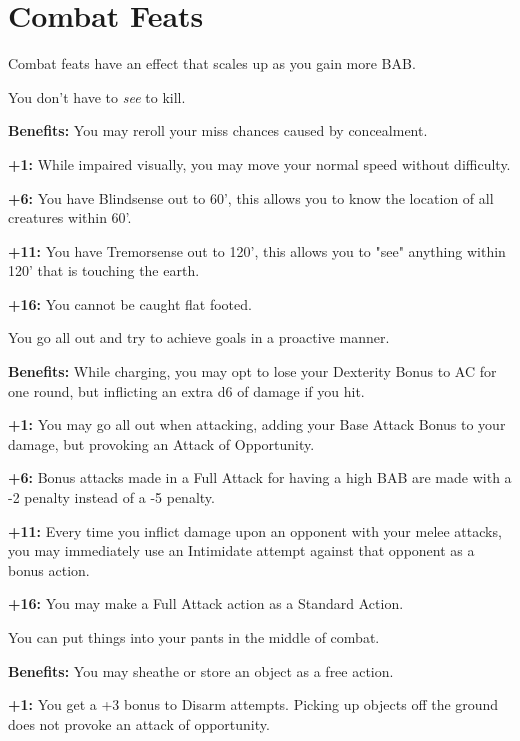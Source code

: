 \section{Combat Feats}

Combat feats have an effect that scales up as you gain more BAB.


You don't have to \textit{see} to kill.

\textbf{Benefits:} You may reroll your miss chances caused by concealment.

\textbf{+1:} While impaired visually, you may move your normal speed without difficulty.

\textbf{+6:} You have Blindsense out to 60', this allows you to know the location of all creatures within 60'.

\textbf{+11:} You have Tremorsense out to 120', this allows you to "see" anything within 120' that is touching the earth.

\textbf{+16:} You cannot be caught flat footed.


You go all out and try to achieve goals in a proactive manner.

\textbf{Benefits:} While charging, you may opt to lose your Dexterity Bonus to AC for one round, but inflicting an extra d6 of damage if you hit.

\textbf{+1:} You may go all out when attacking, adding your Base Attack Bonus to your damage, but provoking an Attack of Opportunity.

\textbf{+6:} Bonus attacks made in a Full Attack for having a high BAB are made with a -2 penalty instead of a -5 penalty.

\textbf{+11:} Every time you inflict damage upon an opponent with your melee attacks, you may immediately use an Intimidate attempt against that opponent as a bonus action.

\textbf{+16:} You may make a Full Attack action as a Standard Action.


You can put things into your pants in the middle of combat.

\textbf{Benefits:} You may sheathe or store an object as a free action.

\textbf{+1:} You get a +3 bonus to Disarm attempts. Picking up objects off the ground does not provoke an attack of opportunity.

